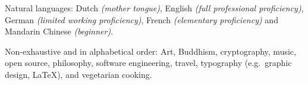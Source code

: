 \documentclass[10pt,a4paper]{article}
\begin{document}
\vspace{-1.7em}

\inlineheadsection
  {Natural languages:}
  {Dutch \emph{(mother tongue)}, English \emph{(full professional proficiency)}, German \emph{(limited working proficiency)}, French \emph{(elementary proficiency)} and Mandarin Chinese \emph{(beginner)}.}


\spacedhrule{-0.1em}{-0.4em}


\inlineheadsection
  {Non-exhaustive and in alphabetical order:}
  {Art, Buddhism, cryptography, music, open source, philosophy, software engineering, travel, typography (e.g.\ graphic design, \LaTeX),  and vegetarian cooking.}
\end{document}
